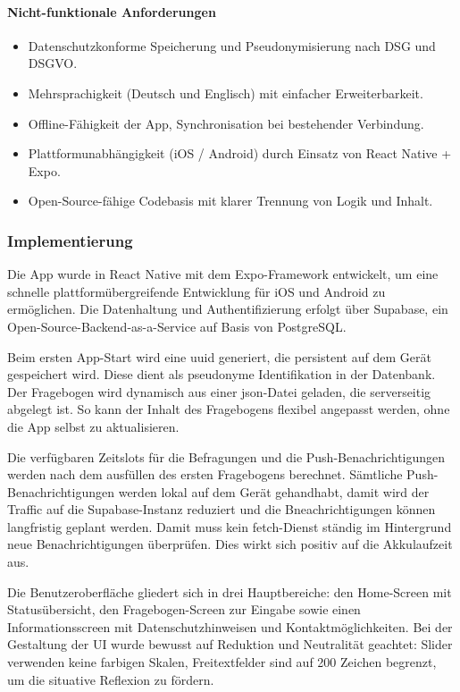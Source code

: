 \paragraph{Nicht-funktionale Anforderungen}
\begin{itemize}
  \item Datenschutzkonforme Speicherung und Pseudonymisierung nach DSG und DSGVO.
  \item Mehrsprachigkeit (Deutsch und Englisch) mit einfacher Erweiterbarkeit.
  \item Offline-Fähigkeit der App, Synchronisation bei bestehender Verbindung.
  \item Plattformunabhängigkeit (iOS / Android) durch Einsatz von React Native + Expo.
  \item Open-Source-fähige Codebasis mit klarer Trennung von Logik und Inhalt.
\end{itemize}


\subsubsection{Implementierung}
Die App wurde in React Native mit dem Expo-Framework entwickelt, um eine schnelle plattformübergreifende Entwicklung für iOS und Android zu ermöglichen. Die Datenhaltung und Authentifizierung erfolgt über Supabase, ein Open-Source-Backend-as-a-Service auf Basis von PostgreSQL.

Beim ersten App-Start wird eine \gls{uuid} generiert, die persistent auf dem Gerät gespeichert wird. Diese dient als pseudonyme Identifikation in der Datenbank. Der Fragebogen wird dynamisch aus einer \gls{json}-Datei geladen, die serverseitig abgelegt ist. So kann der Inhalt des Fragebogens flexibel angepasst werden, ohne die App selbst zu aktualisieren.

Die verfügbaren Zeitslots für die Befragungen und die Push-Benachrichtigungen werden nach dem ausfüllen des ersten Fragebogens berechnet. Sämtliche Push-Benachrichtigungen werden lokal auf dem Gerät gehandhabt, damit wird der Traffic auf die Supabase-Instanz reduziert und die Bneachrichtigungen können langfristig geplant werden. Damit muss kein fetch-Dienst ständig im Hintergrund neue Benachrichtigungen überprüfen. Dies wirkt sich positiv auf die Akkulaufzeit aus.

Die Benutzeroberfläche gliedert sich in drei Hauptbereiche: den Home-Screen mit Statusübersicht, den Fragebogen-Screen zur Eingabe sowie einen Informationsscreen mit Datenschutzhinweisen und Kontaktmöglichkeiten. Bei der Gestaltung der UI wurde bewusst auf Reduktion und Neutralität geachtet: Slider verwenden keine farbigen Skalen, Freitextfelder sind auf 200 Zeichen begrenzt, um die situative Reflexion zu fördern.

